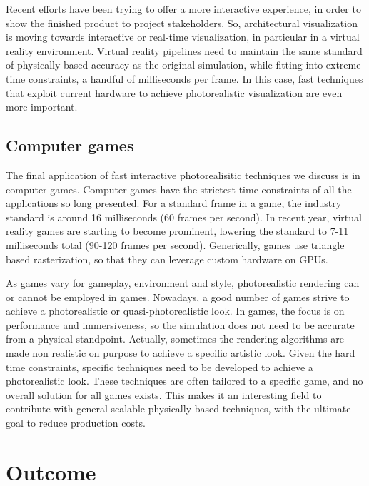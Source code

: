 Recent efforts have been trying to offer a more interactive experience, in order to show the finished product to project stakeholders. So, architectural visualization is moving towards interactive or real-time visualization, in particular in a virtual reality environment. Virtual reality pipelines need to maintain the same standard of physically based accuracy as the original simulation, while fitting into extreme time constraints, a handful of milliseconds per frame. In this case, fast techniques that exploit current hardware to achieve photorealistic visualization are even more important.


\subsection{Computer games}

The final application of fast interactive photorealisitic techniques we discuss is in computer games. Computer games have the strictest time constraints of all the applications so long presented. For a standard frame in a game, the industry standard is around 16 milliseconds (60 frames per second). In recent year, virtual reality games are starting to become prominent, lowering the standard to 7-11 milliseconds total (90-120 frames per second). Generically, games use triangle based rasterization, so that they can leverage custom hardware on GPUs. 

As games vary for gameplay, environment and style, photorealistic rendering can or cannot be employed in games. Nowadays, a good number of games strive to achieve a photorealistic or quasi-photorealistic look. In games, the focus is on performance and immersiveness, so the simulation does not need to be accurate from a physical standpoint. Actually, sometimes the rendering algorithms are made non realistic on purpose to achieve a specific artistic look. Given the hard time constraints, specific techniques need to be developed to achieve a photorealistic look. These techniques are often tailored to a specific game, and no overall solution for all games exists. This makes it an interesting field to contribute with general scalable physically based techniques, with the ultimate goal to reduce production costs.

\section{Outcome}

